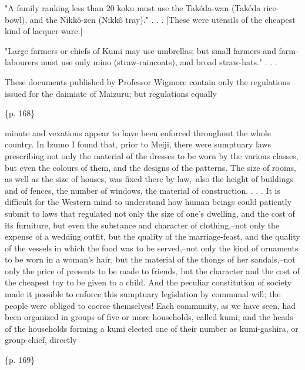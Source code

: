 "A family ranking less than 20 koku must use the Takéda-wan (Takéda rice-bowl), and the Nikkô-zen (Nikkô tray)." . . . [These were utensils of the cheapest kind of lacquer-ware.]

"Large farmers or chiefs of Kumi may use umbrellas; but small farmers and farm-labourers must use only mino (straw-raincoats), and broad straw-hats." . . .

These documents published by Professor Wigmore contain only the regulations issued for the daimiate of Maizuru; but regulations equally

\{p. 168\}

minute and vexatious appear to have been enforced throughout the whole country. In Izumo I found that, prior to Meiji, there were sumptuary laws prescribing not only the material of the dresses to be worn by the various classes, but even the colours of them, and the designs of the patterns. The size of rooms, as well as the size of houses, was fixed there by law,--also the height of buildings and of fences, the number of windows, the material of construction. . . . It is difficult for the Western mind to understand how human beings could patiently submit to laws that regulated not only the size of one's dwelling, and the cost of its furniture, but even the substance and character of clothing,--not only the expense of a wedding outfit, but the quality of the marriage-feast, and the quality of the vessels in which the food was to be served,--not only the kind of ornaments to be worn in a woman's hair, but the material of the thongs of her sandals,--not only the price of presents to be made to friends, but the character and the cost of the cheapest toy to be given to a child. And the peculiar constitution of society made it possible to enforce this sumptuary legislation by communal will; the people were obliged to coerce themselves! Each community, as we have seen, had been organized in groups of five or more households, called kumi; and the heads of the households forming a kumi elected one of their number as kumi-gashira, or group-chief, directly

\{p. 169\}

